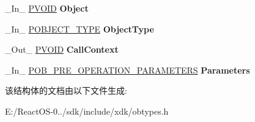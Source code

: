 \begin{DoxyCompactItemize}
\begin{tabbing}
\end{tabbing}\item 
\mbox{\label{struct___o_b___p_r_e___o_p_e_r_a_t_i_o_n___i_n_f_o_r_m_a_t_i_o_n_a8ffdde579617713c1559fd7727009ae4}} 
\+\_\+\+In\+\_\+ \hyperlink{interfacevoid}{P\+V\+O\+ID} {\bfseries Object}
\item 
\mbox{\label{struct___o_b___p_r_e___o_p_e_r_a_t_i_o_n___i_n_f_o_r_m_a_t_i_o_n_a52530db47848dc5455616eee2fb15b64}} 
\+\_\+\+In\+\_\+ \hyperlink{struct___o_b_j_e_c_t___t_y_p_e}{P\+O\+B\+J\+E\+C\+T\+\_\+\+T\+Y\+PE} {\bfseries Object\+Type}
\item 
\mbox{\label{struct___o_b___p_r_e___o_p_e_r_a_t_i_o_n___i_n_f_o_r_m_a_t_i_o_n_a36fa62af3f85ec5e7d8e89a1f374c6cb}} 
\+\_\+\+Out\+\_\+ \hyperlink{interfacevoid}{P\+V\+O\+ID} {\bfseries Call\+Context}
\item 
\mbox{\label{struct___o_b___p_r_e___o_p_e_r_a_t_i_o_n___i_n_f_o_r_m_a_t_i_o_n_a36f58b4788e04e63405907751db26449}} 
\+\_\+\+In\+\_\+ \hyperlink{union___o_b___p_r_e___o_p_e_r_a_t_i_o_n___p_a_r_a_m_e_t_e_r_s}{P\+O\+B\+\_\+\+P\+R\+E\+\_\+\+O\+P\+E\+R\+A\+T\+I\+O\+N\+\_\+\+P\+A\+R\+A\+M\+E\+T\+E\+RS} {\bfseries Parameters}
\end{DoxyCompactItemize}


该结构体的文档由以下文件生成\+:\begin{DoxyCompactItemize}
\item 
E\+:/\+React\+O\+S-\/0../sdk/include/xdk/obtypes.\+h\end{DoxyCompactItemize}
